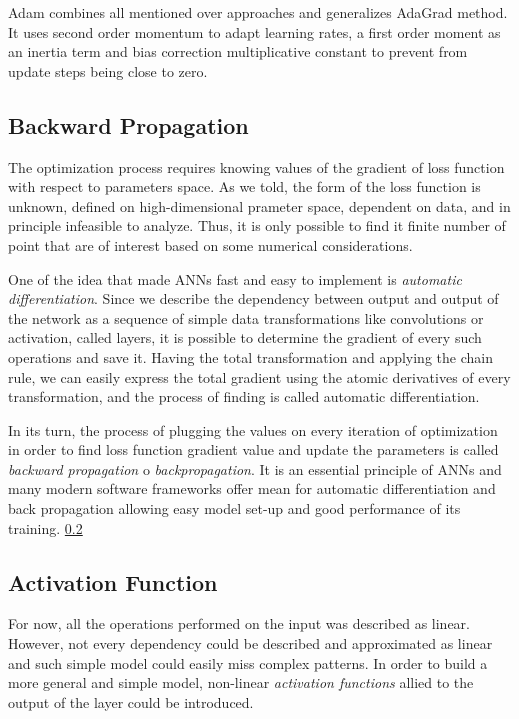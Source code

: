 Adam combines all mentioned over approaches and generalizes AdaGrad method.
It uses second order momentum to adapt learning rates, a first order moment as an inertia term and bias correction multiplicative constant to prevent from update steps being close to zero.

\subsection{Backward Propagation}

The optimization process requires knowing values of the gradient of loss function with respect to parameters space.
As we told, the form of the loss function is unknown, defined on high-dimensional prameter space, dependent on data, and in principle infeasible to analyze.
Thus, it is only possible to find it finite number of point that are of interest based on some numerical considerations.

\medskip
One of the idea that made ANNs fast and easy to implement is \textit{automatic differentiation}.
Since we describe the dependency between output and output of the network as a sequence of simple data transformations like convolutions or activation, called layers, it is possible to determine the gradient of every such operations and save it.
Having the total transformation and applying the chain rule, we can easily express the total gradient using the atomic derivatives of every transformation, and the process of finding is called automatic differentiation. 

\medskip
In its turn, the process of plugging the values on every iteration of optimization in order to find loss function gradient value and update the parameters is called \textit{backward propagation} o \textit{backpropagation}.
It is an essential principle of ANNs and many modern software frameworks offer mean for automatic differentiation and back propagation allowing easy model set-up and good performance of its training. \ref{} 



\subsection{Activation Function}

For now, all the operations performed on the input was described as linear.
However, not every dependency could be described and approximated as linear and such simple model could easily miss complex patterns.
In order to build a more general and simple model, non-linear \textit{activation functions} allied to the output of the layer could be introduced.
\medskip

